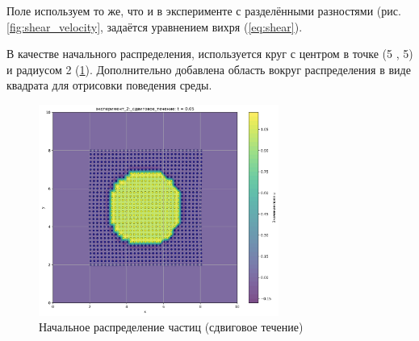 Поле используем то же, что и в эксперименте с разделёнными разностями (рис. \ref{fig:shear_velocity},  задаётся уравнением вихря (\ref{eq:shear}).

В качестве начального распределения, используется круг с центром в точке (5 , 5) и радиусом 2 (\ref{fig:lg_shaer_begin}). Дополнительно добавлена область вокруг распределения в виде квадрата для отрисовки поведения среды.
\begin{figure}
	\centering
	\includegraphics[width=0.7\textwidth]{imgs/lg/эксперимент_2:_сдвиговое_течение_t0.05.png}
	\caption{Начальное распределение частиц (сдвиговое течение)}
	\label{fig:lg_shaer_begin}
\end{figure}

